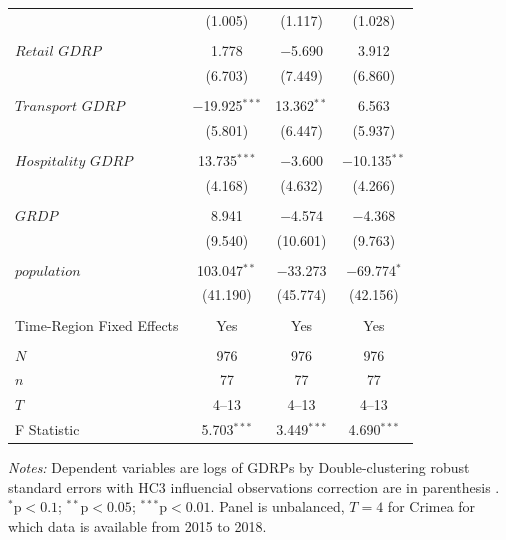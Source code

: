 \documentclass[12pt]{article}
\numberwithin{equation}{section}
\numberwithin{table}{section}
\numberwithin{figure}{section}
\begin{document}
\begin{table}[!htbp]
\begin{threeparttable}
\begin{tabular}{@{\extracolsep{5pt}}lccc}
  & (1.005) & (1.117) & (1.028) \\ 
  & & & \\ 
 $\textit{Retail GDRP}$ & 1.778 & $-$5.690 & 3.912 \\ 
  & (6.703) & (7.449) & (6.860) \\ 
  & & & \\ 
 $\textit{Transport GDRP}$ & $-$19.925$^{***}$ & 13.362$^{**}$ & 6.563 \\ 
  & (5.801) & (6.447) & (5.937) \\ 
  & & & \\ 
 $\textit{Hospitality GDRP}$& 13.735$^{***}$ & $-$3.600 & $-$10.135$^{**}$ \\ 
  & (4.168) & (4.632) & (4.266) \\ 
  & & & \\ 
  $\textit{GRDP}$ & 8.941 & $-$4.574 & $-$4.368 \\ 
  & (9.540) & (10.601) & (9.763) \\ 
  & & & \\ 
 $\textit{population}$ & 103.047$^{**}$ & $-$33.273 & $-$69.774$^{*}$ \\ 
  & (41.190) & (45.774) & (42.156) \\ 
  & & & \\ 
  Time-Region Fixed Effects & Yes& Yes& Yes \\
  \hline \\[-1.8ex] 
  $N$ & 976 & 976 & 976 \\ 
  $n$ & 77& 77& 77\\
  $T$ & 4--13 & 4--13& 4--13\\
  F Statistic & 5.703$^{***}$ & 3.449$^{***}$ & 4.690$^{***}$ \\ 
  \hline 
  \hline 
  \end{tabular} 
  \begin{tablenotes}[flushleft]
    \item \textit{Notes:} Dependent variables are logs of GDRPs by  Double-clustering robust standard errors with HC3 influencial observations correction are in parenthesis \citep{Thompson2011,Cameron2011}. $^{*}\mathrm{p}<0.1$; $^{**}\mathrm{p}<0.05$; $^{***}\mathrm{p}<0.01$. Panel is unbalanced, $T=4$ for Crimea for which data is available from 2015 to 2018.
  \end{tablenotes}
\end{threeparttable}
  \end{table} 

\newpage 
{}


\appendix
\end{document}
